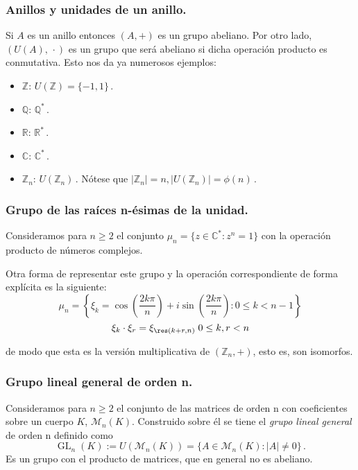 \subsubsection{Anillos y unidades de un anillo.}

Si $A$ es un anillo entonces $(A,+)$ es un grupo abeliano. Por otro lado, $(U(A),\,\cdot)$ es un grupo que será abeliano si dicha operación producto es conmutativa. Esto nos da ya numerosos ejemplos:

\begin{itemize}
  \item $\mathbb{Z}$: $U\left(\mathbb{Z}\right)=\{-1,1\}$\,.
  \item $\mathbb{Q}$: $\mathbb{Q}^{*}$\,.
  \item $\mathbb{R}$: $\mathbb{R}^{*}$\,.
  \item $\mathbb{C}$: $\mathbb{C}^{*}$\,.
  \item $\mathbb{Z}_n$: $U\left(\mathbb{Z}_n\right)$\,. Nótese que $|\mathbb{Z}_n| = n,|U\left(\mathbb{Z}_n\right)| = \phi(n)$\,.
\end{itemize}

\subsubsection{Grupo de las raíces n-ésimas de la unidad.}

Consideramos para $n \ge 2$ el conjunto $\mu_n = \{z \in \mathbb{C}^{*} : z^n = 1\}$ con la operación producto de números complejos. 

Otra forma de representar este grupo y la operación correspondiente de forma explícita es la siguiente:
$$\mu_n = \left\{\xi_k = \cos\left(\frac{2k\pi}{n}\right)+i\sin\left(\frac{2k\pi}{n}\right) : 0 \le k < n-1 \right\}$$
$$\xi_k \cdot \xi_r = \xi_{\res(k+r,n)} \; 0 \le k,r < n$$

de modo que esta es la versión multiplicativa de $(\mathbb{Z}_n,+)$, esto es, son isomorfos.

\subsubsection{Grupo lineal general de orden n.}

Consideramos para $n \ge 2$ el conjunto de las matrices de orden n con coeficientes sobre un cuerpo $K$, $\mathcal M_n(K)$. Construido sobre él se tiene el \textit{grupo lineal general} de orden n definido como \begin{equation*}
  \operatorname{GL}_n(K) := U(\mathcal M_n(K)) = \{A \in \mathcal M_n(K) : |A| \neq 0\}\,.
\end{equation*}Es un grupo con el producto de matrices, que en general no es abeliano.

